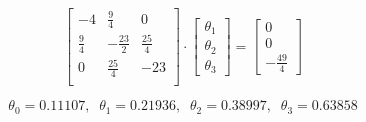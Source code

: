 \begin{equation*}
  \begin{bmatrix}
    -4          & \frac{9}{4}   & 0            \\
    \frac{9}{4} & -\frac{23}{2} & \frac{25}{4} \\
    0           & \frac{25}{4}  & -23          \\
  \end{bmatrix}
  \cdot
  \begin{bmatrix}
    \theta_1 \\ \theta_2 \\ \theta_3
  \end{bmatrix}
  =
  \begin{bmatrix}
    0 \\ 0 \\ -\frac{49}{4}
  \end{bmatrix}
\end{equation*}

\begin{equation}
  \theta_0 = 0.11107, \;\; \theta_1 = 0.21936, \;\; \theta_2 = 0.38997, \;\; \theta_3 = 0.63858
\end{equation}








